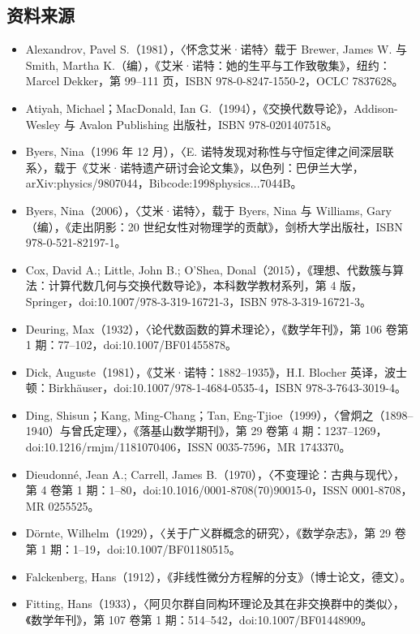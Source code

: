 \subsection{资料来源}
\begin{itemize}
\item Alexandrov, Pavel S.（1981），〈怀念艾米·诺特〉载于 Brewer, James W. 与 Smith, Martha K.（编），《艾米·诺特：她的生平与工作致敬集》，纽约：Marcel Dekker，第 99–111 页，ISBN 978-0-8247-1550-2，OCLC 7837628。
\item Atiyah, Michael；MacDonald, Ian G.（1994），《交换代数导论》，Addison-Wesley 与 Avalon Publishing 出版社，ISBN 978-0201407518。
\item Byers, Nina（1996 年 12 月），〈E. 诺特发现对称性与守恒定律之间深层联系〉，载于《艾米·诺特遗产研讨会论文集》，以色列：巴伊兰大学，arXiv:physics/9807044，Bibcode:1998physics...7044B。
\item Byers, Nina（2006），〈艾米·诺特〉，载于 Byers, Nina 与 Williams, Gary（编），《走出阴影：20 世纪女性对物理学的贡献》，剑桥大学出版社，ISBN 978-0-521-82197-1。
\item Cox, David A.; Little, John B.; O'Shea, Donal（2015），《理想、代数簇与算法：计算代数几何与交换代数导论》，本科数学教材系列，第 4 版，Springer，doi:10.1007/978-3-319-16721-3，ISBN 978-3-319-16721-3。
\item Deuring, Max（1932），〈论代数函数的算术理论〉，《数学年刊》，第 106 卷第 1 期：77–102，doi:10.1007/BF01455878。
\item Dick, Auguste（1981），《艾米·诺特：1882–1935》，H.I. Blocher 英译，波士顿：Birkhäuser，doi:10.1007/978-1-4684-0535-4，ISBN 978-3-7643-3019-4。
\item Ding, Shisun；Kang, Ming-Chang；Tan, Eng-Tjioe（1999），〈曾炯之（1898–1940）与曾氏定理〉，《落基山数学期刊》，第 29 卷第 4 期：1237–1269，doi:10.1216/rmjm/1181070406，ISSN 0035-7596，MR 1743370。
\item Dieudonné, Jean A.; Carrell, James B.（1970），〈不变理论：古典与现代〉，第 4 卷第 1 期：1–80，doi:10.1016/0001-8708(70)90015-0，ISSN 0001-8708，MR 0255525。
\item Dörnte, Wilhelm（1929），〈关于广义群概念的研究〉，《数学杂志》，第 29 卷第 1 期：1–19，doi:10.1007/BF01180515。
\item Falckenberg, Hans（1912），《非线性微分方程解的分支》（博士论文，德文）。
\item Fitting, Hans（1933），〈阿贝尔群自同构环理论及其在非交换群中的类似〉，《数学年刊》，第 107 卷第 1 期：514–542，doi:10.1007/BF01448909。

\end{itemize}
